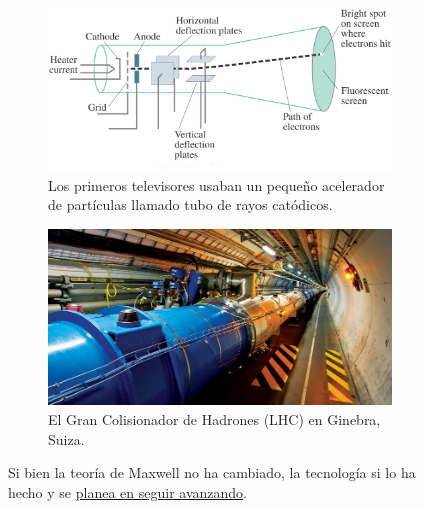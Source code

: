 \begin{description}
\begin{figure}
\centering
\begin{subfigure}{.45\textwidth}
  \centering
  \includegraphics[width=\textwidth]{lecture1/Cathode-Ray-Tube-Diagram.jpg}
  \caption{Los primeros televisores usaban un peque\~no acelerador de part\'iculas llamado tubo de rayos cat\'odicos.}
  \label{fig:sub_cathode}
\end{subfigure}%
\hfill
\begin{subfigure}{.45\textwidth}
  \centering
  \includegraphics[width=\textwidth]{lecture1/lhc_long.jpg}
  \caption{El Gran Colisionador de Hadrones (LHC) en Ginebra, Suiza.}
  \label{fig:sub_lhc}
\end{subfigure}
\caption{Si bien la teor\'ia de Maxwell no ha cambiado, la tecnolog\'ia si lo ha hecho y se \href{https://horizon-magazine.eu/article/physicists-accelerate-plans-new-large-hadron-collider-three-times-big_en.html}{planea en seguir avanzando}.}
\label{fig:aceleradores}
\end{figure}


\end{description}
